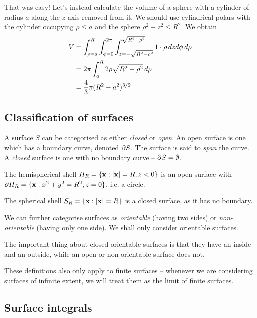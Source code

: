 \documentclass{../template/note}
\begin{document}
    \begin{example*}
        That was easy! Let's instead calculate the volume of a sphere with a cylinder of radius \(a\) along the \(z\)-axis removed from it. We should use cylindrical polars with the cylinder occupying \(\rho \leq a\) and the sphere \(\rho^2 + z^2 \leq R^2\). We obtain
        \begin{align*}
            V &= \int_{\rho=a}^R \int_{\phi=0}^{2\pi} \int_{z=-\sqrt{R^2-\rho^2}}^{\sqrt{R^2-\rho^2}} 1 \cdot \rho \,d{z} d\phi \, d\rho \\
            &= 2\pi \int_a^R 2\rho \sqrt{R^2-\rho^2} \,d{\rho} \\
            &= \frac 4 3 \pi (R^2-a^2)^{3/2}
        \end{align*}
    \end{example*}
    
    \subsection{Classification of surfaces}

    A surface \(S\) can be categorised as either \emph{closed} or \emph{open}. An open surface is one which has a boundary curve, denoted \(\partial S\). The surface is said to \emph{span} the curve. A \emph{closed} surface is one with no boundary curve -- \(\partial S = \emptyset\).

    \begin{example*}
        The hemispherical shell \(H_R = \{\V x: |\V x| = R, z < 0\}\) is an open surface with \(\pr H_R = \{\V x : x^2 + y^2 = R^2, z = 0\}\), i.e. a circle.

        The spherical shell \(S_R = \{\V x: |\V x| = R\}\) is a closed surface, as it has no boundary.
    \end{example*}
    
    We can further categorise surfaces as \emph{orientable} (having two sides) or \emph{non-orientable} (having only one side). We shall only consider orientable surfaces.
    
    The important thing about closed orientable surfaces is that they have an inside and an outside, while an open or non-orientable surface does not.

    These definitions also only apply to finite surfaces -- whenever we are considering surfaces of infinite extent, we will treat them as the limit of finite surfaces.
    
    \subsection{Surface integrals}
\end{document}
